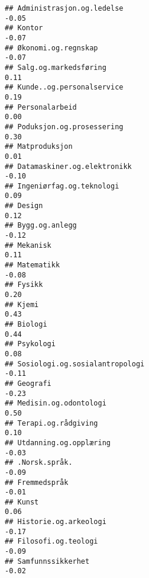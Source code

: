 \documentclass[
]{article}
\begin{document}
\begin{verbatim}
## Administrasjon.og.ledelse                                                        -0.05
## Kontor                                                                           -0.07
## Økonomi.og.regnskap                                                              -0.07
## Salg.og.markedsføring                                                             0.11
## Kunde..og.personalservice                                                         0.19
## Personalarbeid                                                                    0.00
## Poduksjon.og.prosessering                                                         0.30
## Matproduksjon                                                                     0.01
## Datamaskiner.og.elektronikk                                                      -0.10
## Ingeniørfag.og.teknologi                                                          0.09
## Design                                                                            0.12
## Bygg.og.anlegg                                                                   -0.12
## Mekanisk                                                                          0.11
## Matematikk                                                                       -0.08
## Fysikk                                                                            0.20
## Kjemi                                                                             0.43
## Biologi                                                                           0.44
## Psykologi                                                                         0.08
## Sosiologi.og.sosialantropologi                                                   -0.11
## Geografi                                                                         -0.23
## Medisin.og.odontologi                                                             0.50
## Terapi.og.rådgiving                                                               0.10
## Utdanning.og.opplæring                                                           -0.03
## .Norsk.språk.                                                                    -0.09
## Fremmedspråk                                                                     -0.01
## Kunst                                                                             0.06
## Historie.og.arkeologi                                                            -0.17
## Filosofi.og.teologi                                                              -0.09
## Samfunnssikkerhet                                                                -0.02

\end{verbatim}
\end{document}
